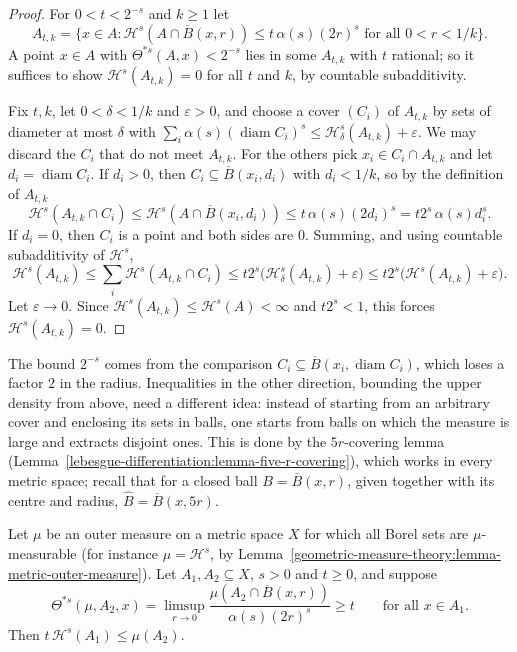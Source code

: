 \begin{proof}
For $0 < t < 2^{-s}$ and $k \geq 1$ let
\[
A_{t, k} = \bigl\{x \in A : \mathcal{H}^s(A \cap \overline{B}(x, r)) \leq t\,\alpha(s)(2r)^s \text{ for all } 0 < r < 1/k\bigr\}.
\]
A point $x \in A$ with $\Theta^{*s}(A, x) < 2^{-s}$ lies in some $A_{t, k}$ with $t$ rational; so it suffices to show $\mathcal{H}^s(A_{t, k}) = 0$ for all $t$ and $k$, by countable subadditivity.

Fix $t, k$, let $0 < \delta < 1/k$ and $\varepsilon > 0$, and choose a cover $(C_i)$ of $A_{t, k}$ by sets of diameter at most $\delta$ with
$\sum_i\alpha(s)(\operatorname{diam}C_i)^s \leq \mathcal{H}^s_\delta(A_{t, k}) + \varepsilon$. We may discard the $C_i$ that do not meet $A_{t, k}$. For the others pick $x_i \in C_i \cap A_{t, k}$ and let
$d_i = \operatorname{diam}C_i$. If $d_i > 0$, then $C_i \subseteq \overline{B}(x_i, d_i)$ with $d_i < 1/k$, so by the definition of $A_{t, k}$
\[
\mathcal{H}^s(A_{t, k} \cap C_i) \leq \mathcal{H}^s(A \cap \overline{B}(x_i, d_i)) \leq t\,\alpha(s)(2d_i)^s = t2^s\,\alpha(s)d_i^s .
\]
If $d_i = 0$, then $C_i$ is a point and both sides are $0$. Summing, and using countable subadditivity of $\mathcal{H}^s$,
\[
\mathcal{H}^s(A_{t, k}) \leq \sum_i\mathcal{H}^s(A_{t, k} \cap C_i) \leq t2^s\bigl(\mathcal{H}^s_\delta(A_{t, k}) + \varepsilon\bigr) \leq t2^s\bigl(\mathcal{H}^s(A_{t, k}) + \varepsilon\bigr).
\]
Let $\varepsilon \to 0$. Since $\mathcal{H}^s(A_{t, k}) \leq \mathcal{H}^s(A) < \infty$ and $t2^s < 1$, this forces $\mathcal{H}^s(A_{t, k}) = 0$.
\end{proof}

The bound $2^{-s}$ comes from the comparison $C_i \subseteq \overline{B}(x_i, \operatorname{diam}C_i)$, which loses a factor $2$ in the radius. Inequalities in the other direction, bounding the
upper density from above, need a different idea: instead of starting from an arbitrary cover and enclosing its sets in balls, one starts from balls on which the measure is large and extracts disjoint
ones. This is done by the $5r$-covering lemma (Lemma~\ref{lebesgue-differentiation:lemma-five-r-covering}), which works in every metric space; recall that for a closed ball
$B = \overline{B}(x, r)$, given together with its centre and radius, $\widehat{B} = \overline{B}(x, 5r)$.

\begin{theorem}\label{geometric-measure-theory:theorem-density-lower-comparison}
Let $\mu$ be an outer measure on a metric space $X$ for which all Borel sets are $\mu$-measurable (for instance $\mu = \mathcal{H}^s$, by Lemma~\ref{geometric-measure-theory:lemma-metric-outer-measure}). Let
$A_1, A_2 \subseteq X$, $s > 0$ and $t \geq 0$, and suppose
\[
\Theta^{*s}(\mu, A_2, x) = \limsup_{r \to 0}\frac{\mu(A_2 \cap \overline{B}(x, r))}{\alpha(s)(2r)^s} \geq t \qquad \text{for all } x \in A_1 .
\]
Then $t\,\mathcal{H}^s(A_1) \leq \mu(A_2)$.
\end{theorem}

